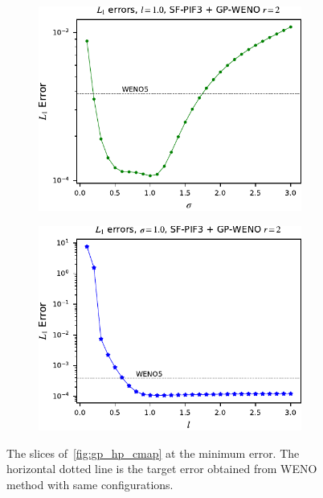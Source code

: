 \begin{figure}
    \centering
    \begin{subfigure}{70mm}
        \centering
        \includegraphics[width=0.95\textwidth]{fig/hp_best_ell_gp2_sf3}
    \end{subfigure}
    \begin{subfigure}{70mm}
        \centering
        \includegraphics[width=0.95\textwidth]{fig/hp_best_sig_gp2_sf3}
    \end{subfigure}
    \caption{The slices of~\cref{fig:gp_hp_cmap} at the minimum error.
        The horizontal dotted line is the target error obtained from WENO method
        with same configurations.
    }\label{fig:gp_hp_best}
\end{figure}

